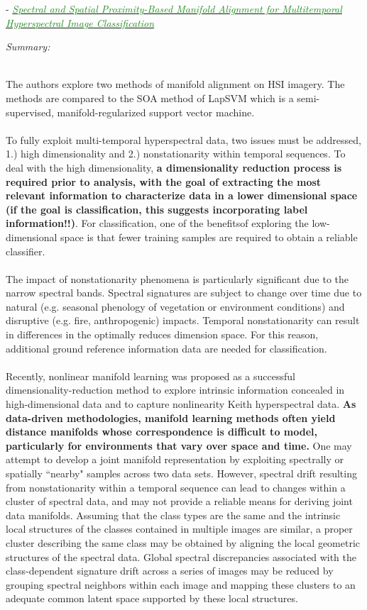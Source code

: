 \documentclass[]{article}
\newcommand{\paperentry}[4]{
            \hangindent=1cm
            \textcolor{red}{\cite{#1}} - \href{run:../References/#3}{\textcolor{ForestGreen}{\textit{#2}}}
            
            \noindent            
            \begin{minipage}[t]{0.1\linewidth}\hfill\end{minipage}
            \begin{minipage}[t]{0.8\linewidth}\textcolor{NavyBlue}{{\textit{Summary:}}}#4\end{minipage}
            \vspace{.25cm}
          }
\begin{document}
		\paperentry{Yang2016ManifoldAlignmentMultitemporalHSI}
		{Spectral and Spatial Proximity-Based Manifold Alignment for Multitemporal Hyperspectral Image Classification}
		{Manifold_Representation_Learning/Alignment/Yang2016ManifoldAlignmentMultitemporalHSI.pdf}
		{}\\
		The authors explore two methods of manifold alignment on HSI imagery.  The methods are compared to the SOA  method of LapSVM which is a semi-supervised, manifold-regularized support vector machine.
		\\ \\
		To fully exploit multi-temporal hyperspectral data, two issues must be addressed, 1.) high dimensionality and 2.) nonstationarity within temporal sequences.  To deal with the high dimensionality, \textbf{a dimensionality reduction process is required prior to analysis, with the goal of extracting the most relevant information to characterize data in a lower dimensional space (if the goal is classification, this suggests incorporating label information!!)}.  For classification, one of the benefitsof exploring the low-dimensional space is that fewer training samples are required to obtain a reliable classifier. 
		\\ \\
		The impact of nonstationarity phenomena is particularly significant due to the narrow spectral bands.   Spectral signatures are subject to change over time due to natural (e.g. seasonal phenology of vegetation or environment conditions) and disruptive (e.g. fire, anthropogenic) impacts.  Temporal nonstationarity can result in differences in the optimally reduces dimension space.  For this reason, additional ground reference information data are needed for classification.
		\\ \\
		Recently, nonlinear manifold learning was proposed as a successful dimensionality-reduction method to explore intrinsic information concealed in high-dimensional data and to capture nonlinearity Keith hyperspectral data.  \textbf{As data-driven methodologies, manifold learning methods often yield distance manifolds whose correspondence is difficult to model, particularly for environments that vary over space and time.}  One may attempt to develop a joint manifold representation by exploiting spectrally or spatially ``nearby" samples across two data sets.  However, spectral drift resulting from nonstationarity within a temporal sequence can lead to changes within a cluster of spectral data, and may not provide a reliable means for deriving joint data manifolds.  Assuming that the class types are the same and the intrinsic local structures of the classes contained in multiple images are similar, a proper cluster describing the same class may be obtained by aligning the local geometric structures of the spectral data.  Global spectral discrepancies associated with the class-dependent signature drift across a series of images may be reduced by grouping spectral neighbors within each image and mapping these clusters to an adequate common latent space supported by these local structures.
\end{document}
